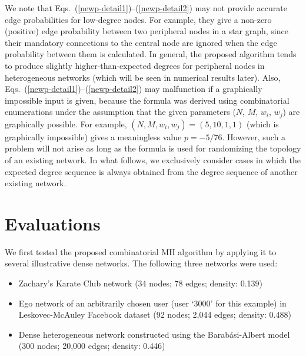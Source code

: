 \documentclass{llncs}
\begin{document}
We note that Eqs.~(\ref{newp-detail1})--(\ref{newp-detail2}) may not
provide accurate edge probabilities for low-degree nodes. For example,
they give a non-zero (positive) edge probability between two
peripheral nodes in a star graph, since their mandatory connections to
the central node are ignored when the edge probability between them is
calculated. In general, the proposed algorithm tends to produce
slightly higher-than-expected degrees for peripheral nodes in
heterogeneous networks (which will be seen in numerical results
later). Also, Eqs.~(\ref{newp-detail1})--(\ref{newp-detail2}) may
malfunction if a graphically impossible input is given, because the
formula was derived using combinatorial enumerations under the
assumption that the given parameters ($N$, $M$, $w_i$, $w_j$) are
graphically possible. For example, $(N, M, w_i, w_j) = (5, 10, 1, 1)$
(which is graphically impossible) gives a meaningless value $p =
-5/76$. However, such a problem will not arise as long as the formula
is used for randomizing the topology of an existing network. In what
follows, we exclusively consider cases in which the expected degree
sequence is always obtained from the degree sequence of another
existing network.

\section{Evaluations}

We first tested the proposed combinatorial MH algorithm by applying it
to several illustrative dense networks. The following three networks
were used:
\begin{itemize}
\item Zachary's Karate Club network \cite{zachary1977information} (34
  nodes; 78 edges; density: 0.139)
\item Ego network of an arbitrarily chosen user (user `3000' for this
  example) in Leskovec-McAuley Facebook dataset
  \cite{leskovec2012learning} (92 nodes; 2,044 edges; density: 0.488)
\item Dense heterogeneous network constructed using the
  Barab\'{a}si-Albert model \cite{barabasi1999emergence} (300 nodes;
  20,000 edges; density: 0.446)
\end{itemize}
\end{document}
